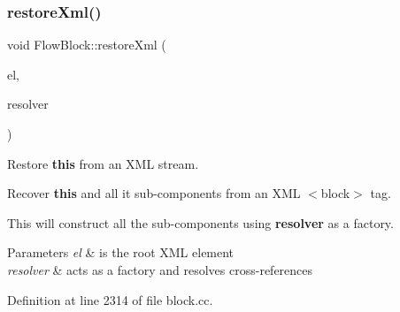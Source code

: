 \subsubsection{\texorpdfstring{restoreXml()}{restoreXml()}}
{\footnotesize\ttfamily void Flow\+Block\+::restore\+Xml (\begin{DoxyParamCaption}\item[{const \mbox{\hyperlink{class_element}{Element}} $\ast$}]{el,  }\item[{\mbox{\hyperlink{class_block_map}{Block\+Map}} \&}]{resolver }\end{DoxyParamCaption})}



Restore {\bfseries{this}} from an X\+ML stream. 

Recover {\bfseries{this}} and all it sub-\/components from an X\+ML $<$block$>$ tag.

This will construct all the sub-\/components using {\bfseries{resolver}} as a factory. 
\begin{DoxyParams}{Parameters}
{\em el} & is the root X\+ML element \\
\hline
{\em resolver} & acts as a factory and resolves cross-\/references \\
\hline
\end{DoxyParams}


Definition at line 2314 of file block.\+cc.

